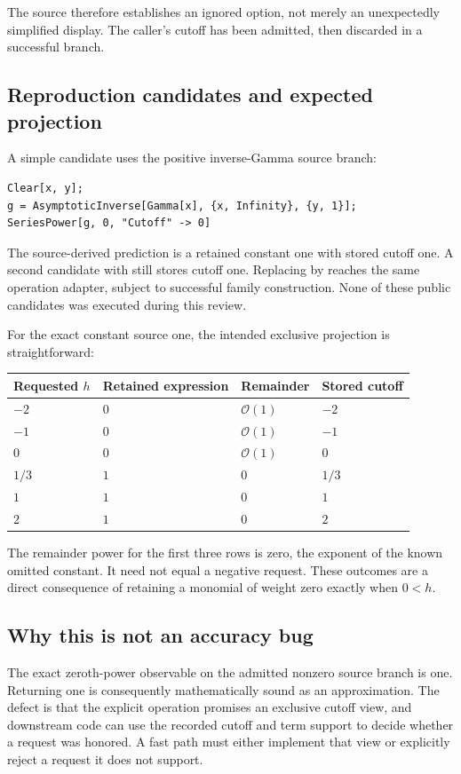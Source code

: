 \documentclass[11pt,letterpaper]{article}
\newcommand{\code}[1]{\texttt{\detokenize{#1}}}
\newcommand{\Oterm}{\mathcal{O}}
\begin{document}
The source therefore establishes an ignored option, not merely an unexpectedly simplified display. The caller's cutoff has been admitted, then discarded in a successful branch.

\subsection{Reproduction candidates and expected projection}

A simple candidate uses the positive inverse-Gamma source branch:
\begin{lstlisting}
Clear[x, y];
g = AsymptoticInverse[Gamma[x], {x, Infinity}, {y, 1}];
SeriesPower[g, 0, "Cutoff" -> 0]
\end{lstlisting}
The source-derived prediction is a retained constant one with stored cutoff one. A second candidate with \code{"Cutoff" -> 2} still stores cutoff one. Replacing \code{Gamma} by \code{BarnesG} reaches the same operation adapter, subject to successful family construction. None of these public candidates was executed during this review.

For the exact constant source one, the intended exclusive projection is straightforward:
\begin{center}
\begin{tabular}{@{}llll@{}}
\toprule
Requested $h$ & Retained expression & Remainder & Stored cutoff\\
\midrule
$-2$ & $0$ & $\Oterm(1)$ & $-2$\\
$-1$ & $0$ & $\Oterm(1)$ & $-1$\\
$0$ & $0$ & $\Oterm(1)$ & $0$\\
$1/3$ & $1$ & $0$ & $1/3$\\
$1$ & $1$ & $0$ & $1$\\
$2$ & $1$ & $0$ & $2$\\
\bottomrule
\end{tabular}
\end{center}
The remainder power for the first three rows is zero, the exponent of the known omitted constant. It need not equal a negative request. These outcomes are a direct consequence of retaining a monomial of weight zero exactly when $0<h$.

\subsection{Why this is not an accuracy bug}

The exact zeroth-power observable on the admitted nonzero source branch is one. Returning one is consequently mathematically sound as an approximation. The defect is that the explicit operation promises an exclusive cutoff view, and downstream code can use the recorded cutoff and term support to decide whether a request was honored. A fast path must either implement that view or explicitly reject a request it does not support.
\end{document}
